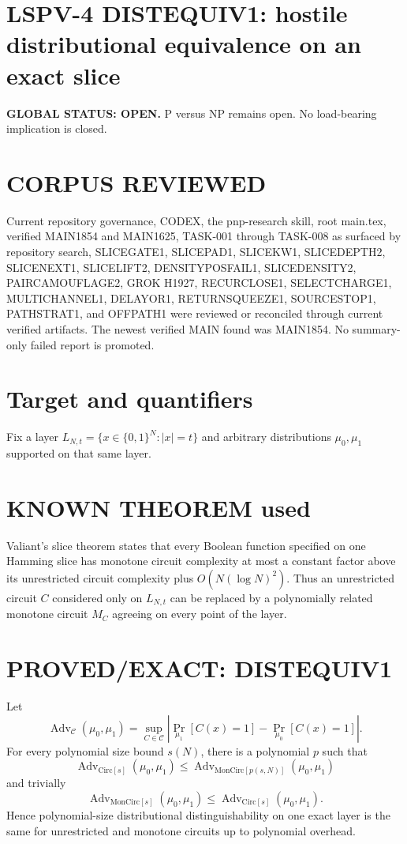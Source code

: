 \documentclass[11pt]{article}
\begin{document}
\section*{LSPV-4 DISTEQUIV1: hostile distributional equivalence on an exact slice}
\textbf{GLOBAL STATUS: OPEN.} P versus NP remains open. No load-bearing implication is closed.

\section*{CORPUS REVIEWED}
Current repository governance, CODEX, the pnp-research skill, root main.tex, verified MAIN1854 and MAIN1625, TASK-001 through TASK-008 as surfaced by repository search, SLICEGATE1, SLICEPAD1, SLICEKW1, SLICEDEPTH2, SLICENEXT1, SLICELIFT2, DENSITYPOSFAIL1, SLICEDENSITY2, PAIRCAMOUFLAGE2, GROK H1927, RECURCLOSE1, SELECTCHARGE1, MULTICHANNEL1, DELAYOR1, RETURNSQUEEZE1, SOURCESTOP1, PATHSTRAT1, and OFFPATH1 were reviewed or reconciled through current verified artifacts. The newest verified MAIN found was MAIN1854. No summary-only failed report is promoted.

\section*{Target and quantifiers}
Fix a layer \(L_{N,t}=\{x\in\{0,1\}^N:|x|=t\}\) and arbitrary distributions \(\mu_0,\mu_1\) supported on that same layer.

\section*{KNOWN THEOREM used}
Valiant's slice theorem states that every Boolean function specified on one Hamming slice has monotone circuit complexity at most a constant factor above its unrestricted circuit complexity plus \(O(N(\log N)^2)\). Thus an unrestricted circuit \(C\) considered only on \(L_{N,t}\) can be replaced by a polynomially related monotone circuit \(M_C\) agreeing on every point of the layer.

\section*{PROVED/EXACT: DISTEQUIV1}
Let
\[
\operatorname{Adv}_{\mathcal C}(\mu_0,\mu_1)
=
\sup_{C\in\mathcal C}
\left|\Pr_{\mu_1}[C(x)=1]-\Pr_{\mu_0}[C(x)=1]\right|.
\]
For every polynomial size bound \(s(N)\), there is a polynomial \(p\) such that
\[
\boxed{
\operatorname{Adv}_{\mathrm{Circ}[s]}(\mu_0,\mu_1)
\le
\operatorname{Adv}_{\mathrm{MonCirc}[p(s,N)]}(\mu_0,\mu_1)
}
\]
and trivially
\[
\operatorname{Adv}_{\mathrm{MonCirc}[s]}(\mu_0,\mu_1)
\le
\operatorname{Adv}_{\mathrm{Circ}[s]}(\mu_0,\mu_1).
\]
Hence polynomial-size distributional distinguishability on one exact layer is the same for unrestricted and monotone circuits up to polynomial overhead.
\end{document}
